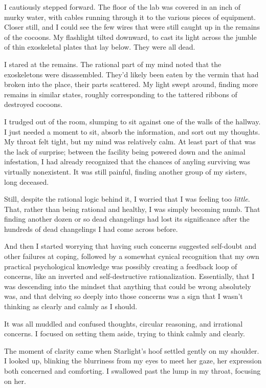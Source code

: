 I cautiously stepped forward. The floor of the lab was covered in an inch of murky water, with cables running through it to the various pieces of equipment. Closer still, and I could see the few wires that were still caught up in the remains of the cocoons. My flashlight tilted downward, to cast its light across the jumble of thin exoskeletal plates that lay below. They were all dead.

I stared at the remains. The rational part of my mind noted that the exoskeletons were disassembled. They’d likely been eaten by the vermin that had broken into the place, their parts scattered. My light swept around, finding more remains in similar states, roughly corresponding to the tattered ribbons of destroyed cocoons.

I trudged out of the room, slumping to sit against one of the walls of the hallway. I just needed a moment to sit, absorb the information, and sort out my thoughts. My throat felt tight, but my mind was relatively calm. At least part of that was the lack of surprise; between the facility being powered down and the animal infestation, I had already recognized that the chances of anyling surviving was virtually nonexistent. It was still painful, finding another group of my sisters, long deceased.

Still, despite the rational logic behind it, I worried that I was feeling too \textit{little}. That, rather than being rational and healthy, I was simply becoming numb. That finding another dozen or so dead changelings had lost its significance after the hundreds of dead changelings I had come across before.

And then I started worrying that having such concerns suggested self-doubt and other failures at coping, followed by a somewhat cynical recognition that my own practical psychological knowledge was possibly creating a feedback loop of concerns, like an inverted and self-destructive rationalization. Essentially, that I was descending into the mindset that anything that could be wrong absolutely was, and that delving so deeply into those concerns was a sign that I wasn’t thinking as clearly and calmly as I should.

It was all muddled and confused thoughts, circular reasoning, and irrational concerns. I focused on setting them aside, trying to think calmly and clearly.

The moment of clarity came when Starlight’s hoof settled gently on my shoulder. I looked up, blinking the blurriness from my eyes to meet her gaze, her expression both concerned and comforting. I swallowed past the lump in my throat, focusing on her.

